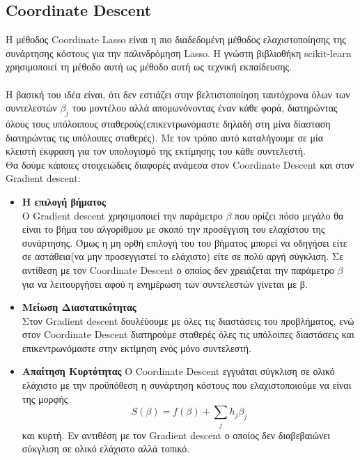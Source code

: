 \documentclass[12pt]{article}
\begin{document}
\subsection{\textlatin{Coordinate Descent}}
Η μέθοδος \textlatin{Coordinate Lasso} είναι η πιο διαδεδομένη μέθοδος ελαχιστοποίησης της συνάρτησης κόστους για την παλινδρόμηση \textlatin{Lasso}. Η γνώστη βιβλιοθήκη \textlatin{scikit-learn} χρησιμοποιεί τη μέθοδο αυτή ως μέθοδο αυτή ως τεχνική εκπαίδευσης.\\
\vspace{0.1pt}\\

Η βασική του ιδέα  είναι, ότι δεν εστιάζει στην βελτιστοποίηση ταυτόχρονα όλων των συντελεστών $\beta_j$ του μοντέλου αλλά απομωνόνοντας έναν κάθε φορά, διατηρώντας όλους τους υπόλοιπους σταθερούς(επικεντρωνόμαστε δηλαδή στη μίνα δίασταση διατηρώντας τις υπόλοιπες σταθερές). Με τον τρόπο αυτό καταλήγουμε σε μία κλειστή έκφραση για τον υπολογισμό της εκτίμησης του κάθε συντελεστή.\\

Θα δούμε κάποιες στοιχειώδεις διαφορές ανάμεσα στον \textlatin{Coordinate Descent} και στον \textlatin{Gradient descent}:
\begin{itemize}
    \item \textbf{Η επιλογή βήματος}\\
    Ο \textlatin{Gradient descent} χρησιμοποιεί την παράμετρο $\beta$ που ορίζει πόσο μεγάλο θα είναι το βήμα του αλγορίθμου με σκοπό την προσέγγιση του ελαχίστου της συνάρτησης. Όμως η μη ορθή επιλογή του του βήματος μπορεί να οδηγήσει είτε σε αστάθεια(να μην προσεγγιστεί το ελάχιστο) είτε σε πολύ αργή σύγκλιση. Σε αντίθεση με τον \textlatin{Coordinate Descent} ο οποίος δεν χρειάζεται την παράμετρο $\beta$ για να λειτουργήσει αφού η ενημέρωση των συντελεστών γίνεται με β.
    \item \textbf{Μείωση Διαστατικότητας}\\
    Στον \textlatin{Gradient descent} δουλέύουμε με όλες τις διαστάσεις του προβλήματος, ενώ στον \textlatin{Coordinate Descent} διατηρούμε σταθερές όλες τις υπόλοιπες διαστάσεις και επικεντρωνόμαστε στην εκτίμηση ενός μόνο συντελεστή.
    \item\textbf{Απαίτηση Κυρτότητας}
    Ο \textlatin{Coordinate Descent} εγγυάται σύγκλιση σε ολικό ελάχιστο με την προϋπόθεση η συνάρτηση κόστους που ελαχιστοποιούμε να είναι της μορφής \[S(\beta) = f(\beta) + \sum_{j} h_j\beta_j\] και κυρτή. Εν αντιθέση με τον \textlatin{Gradient descent} ο οποίος δεν διαβεβαιώνει σύκγλιση σε ολικό ελάχιστο αλλά τοπικό. 
\end{itemize}
\end{document}
